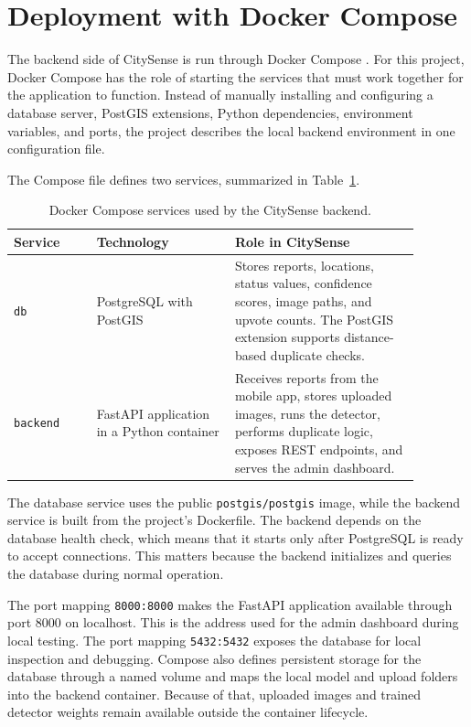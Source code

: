 \section{Deployment with Docker Compose}

The backend side of CitySense is run through Docker Compose \cite{docker_compose_docs}. For this project, Docker Compose has the role of starting the services that must work together for the application to function. Instead of manually installing and configuring a database server, PostGIS extensions, Python dependencies, environment variables, and ports, the project describes the local backend environment in one configuration file.

The Compose file defines two services, summarized in Table~\ref{tab:docker_compose_services}.

\begin{table}[htbp]
\centering
\begin{tabular}{>{\raggedright\arraybackslash}p{0.18\linewidth} >{\raggedright\arraybackslash}p{0.30\linewidth} >{\raggedright\arraybackslash}p{0.40\linewidth}}
\toprule
\textbf{Service} & \textbf{Technology} & \textbf{Role in CitySense} \\
\midrule
\texttt{db} & PostgreSQL with PostGIS & Stores reports, locations, status values, confidence scores, image paths, and upvote counts. The PostGIS extension supports distance-based duplicate checks. \\
\texttt{backend} & FastAPI application in a Python container & Receives reports from the mobile app, stores uploaded images, runs the detector, performs duplicate logic, exposes REST endpoints, and serves the admin dashboard. \\
\bottomrule
\end{tabular}
\caption{Docker Compose services used by the CitySense backend.}
\label{tab:docker_compose_services}
\end{table}

The database service uses the public \texttt{postgis/postgis} image, while the backend service is built from the project's Dockerfile. The backend depends on the database health check, which means that it starts only after PostgreSQL is ready to accept connections. This matters because the backend initializes and queries the database during normal operation.

The port mapping \texttt{8000:8000} makes the FastAPI application available through port 8000 on localhost. This is the address used for the admin dashboard during local testing. The port mapping \texttt{5432:5432} exposes the database for local inspection and debugging. Compose also defines persistent storage for the database through a named volume and maps the local model and upload folders into the backend container. Because of that, uploaded images and trained detector weights remain available outside the container lifecycle.

